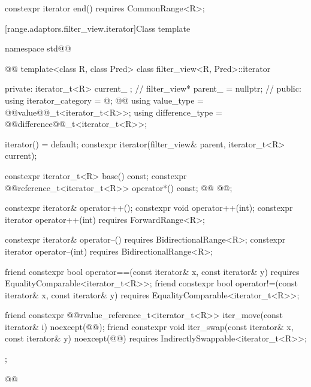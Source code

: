 \begin{itemdescr}
\pnum
\oldtxt{\returns} 
\end{itemdescr}

\begin{itemdecl}
constexpr iterator end() requires CommonRange<R>;
\end{itemdecl}

\begin{itemdescr}
\pnum
\oldtxt{\returns} 
\end{itemdescr}

[range.adaptors.filter_view.iterator]{Class template }

%
\begin{codeblock}
namespace std@@ { @@
  template<class R, class Pred>
  class filter_view<R, Pred>::iterator {
  private:
    iterator_t<R> current_ {};           // \expos
    filter_view* parent_ = nullptr;      // \expos
  public:
    using iterator_category = @\seebelownc@;
    @@
    using value_type        = @@value@@_t<iterator_t<R>>;
    using difference_type   = @@difference@@_t<iterator_t<R>>;

    iterator() = default;
    constexpr iterator(filter_view& parent, iterator_t<R> current);

    constexpr iterator_t<R> base() const;
    constexpr @@reference_t<iterator_t<R>> operator*() const;
    @@
      @@;

    constexpr iterator& operator++();
    constexpr void operator++(int);
    constexpr iterator operator++(int) requires ForwardRange<R>;

    constexpr iterator& operator--() requires BidirectionalRange<R>;
    constexpr iterator operator--(int) requires BidirectionalRange<R>;

    friend constexpr bool operator==(const iterator& x, const iterator& y)
      requires EqualityComparable<iterator_t<R>>;
    friend constexpr bool operator!=(const iterator& x, const iterator& y)
      requires EqualityComparable<iterator_t<R>>;

    friend constexpr @@rvalue_reference_t<iterator_t<R>> iter_move(const iterator& i)
      noexcept(@\oldtxt{\seebelow}@);
    friend constexpr void iter_swap(const iterator& x, const iterator& y)
      noexcept(@\oldtxt{\seebelow}@)
      requires IndirectlySwappable<iterator_t<R>>;
  };
}@\oldtxt{\}}@
\end{codeblock}

